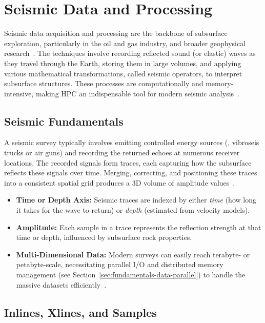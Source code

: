 \section{Seismic Data and Processing}
\label{sec:fundamentals-seismic}

Seismic data acquisition and processing are the backbone of subsurface exploration, particularly in the oil and gas industry, and broader geophysical research~\cite{Yilmaz2001}.
The techniques involve recording reflected sound (or elastic) waves as they travel through the Earth, storing them in large volumes, and applying various mathematical transformations, called seismic operators, to interpret subsurface structures.
These processes are computationally and memory-intensive, making \ac{HPC} an indispensable tool for modern seismic analysis~\cite{Yilmaz2001}.

\subsection{Seismic Fundamentals}
\label{subsec:fundamentals-seismic-fundamentals}

A seismic survey typically involves emitting controlled energy sources (\eg, vibroseis trucks or air guns) and recording the returned echoes at numerous receiver locations.
The recorded signals form traces, each capturing how the subsurface reflects these signals over time.
Merging, correcting, and positioning these traces into a consistent spatial grid produces a \ac{3D} volume of amplitude values~\cite{Yilmaz2001}.

\begin{itemize}
    \item \textbf{Time or Depth Axis:} Seismic traces are indexed by either \emph{time} (how long it takes for the wave to return) or \emph{depth} (estimated from velocity models).
    \item \textbf{Amplitude:} Each sample in a trace represents the reflection strength at that time or depth, influenced by subsurface rock properties.
    \item \textbf{Multi-Dimensional Data:} Modern surveys can easily reach terabyte- or petabyte-scale, necessitating parallel \ac{I/O} and distributed memory management (see Section~\ref{sec:fundamentals-data-parallel}) to handle the massive datasets efficiently~\cite{Yilmaz2001}.
\end{itemize}

\subsection{Inlines, Xlines, and Samples}
\label{subsec:fundamentals-inlines-xlines-samples}

